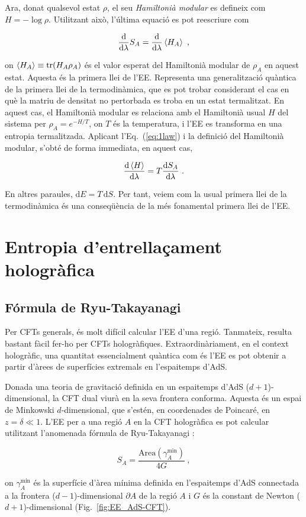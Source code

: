 \documentclass[twocolumn]{revtex4}
\providecommand{\eq}[2]{
    \begin{equation}
        #2
    \label{eq:#1}
    \end{equation}
}
\DeclareMathOperator{\tr}{tr}
\begin{document}
Ara, donat qualsevol estat $\rho$, el seu \emph{Hamiltonià modular} es defineix com $H = - \log \rho$.
Utilitzant això, l'última equació es pot reescriure com
\eq{1law}{
\frac{\mathrm{d}}{\mathrm{d} \lambda} S_A = \frac{\mathrm{d}}{\mathrm{d} \lambda} \braket{H_A} \ ,
}
on $\braket{H_A} \equiv \tr (H_A \rho_A)$ és el valor esperat del Hamiltonià modular de $\rho_A$ en aquest estat. Aquesta és la primera llei de l'EE.
Representa una generalització quàntica de la primera llei de la termodinàmica, que es pot trobar considerant el cas en què la matriu de densitat no pertorbada es troba en un estat termalitzat. En aquest cas, el Hamiltonià modular es relaciona amb el Hamiltonià usual $H$ del sistema per
$
\rho_A = e^{-H/T}
$, on $T$ és la temperatura,
i l'EE es transforma en una entropia termalitzada. Aplicant l'Eq.~(\ref{eq:1law}) i la definició del Hamiltonià modular, s'obté de forma immediata, en aquest cas,
\eq{1law_thermo}{
\frac{\mathrm{d}\braket{H}}{\mathrm{d} \lambda} = T \frac{\mathrm{d}S_A}{\mathrm{d} \lambda} \ .
}
En altres paraules, $\mathrm{d} E = T \, \mathrm{d} S$. Per tant, veiem com la usual primera llei de la termodinàmica és una conseqüència de la més fonamental primera llei de l'EE.


\section{Entropia d'entrellaçament hologràfica} \label{s:EE_Holo}

\subsection{Fórmula de Ryu-Takayanagi} \label{ss:R-T}

Per CFTs generals, és molt difícil calcular l'EE d'una regió. Tanmateix, resulta bastant fàcil fer-ho per CFTs hologràfiques. Extraordinàriament, en el context hologràfic, una quantitat essencialment quàntica com és l'EE es pot obtenir a partir d'àrees de superfícies extremals en l'espaitemps d'AdS.

Donada una teoria de gravitació definida en un espaitemps d'AdS ($d+1$)-dimensional, la CFT dual viurà en la seva frontera conforma. Aquesta és un espai de Minkowski $d$-dimensional, que s'estén, en coordenades de Poincaré, en $z=\delta \ll 1$. L'EE per a una regió $A$ en la CFT hologràfica es pot calcular utilitzant l'anomenada fórmula de Ryu-Takayanagi \cite{ryu_holographic_2008}:
\eq{EE_RT}{
S_A = \frac{ \text{Area}(\gamma_A^\text{min}) }{ 4 G } \ ,
}
on $\gamma_A^\text{min}$ és la superfície d'àrea mínima definida en l'espaitemps d'AdS connectada a la frontera ($d-1$)-dimensional $\partial A$ de la regió $A$ i $G$ és la constant de Newton ($d+1$)-dimensional (Fig.~\ref{fig:EE_AdS-CFT}).
\end{document}
